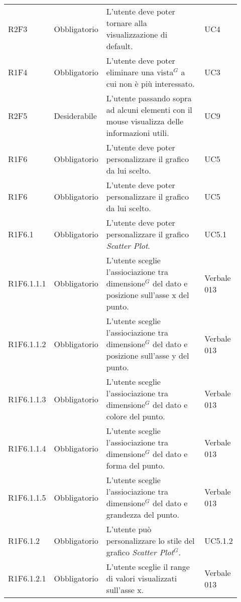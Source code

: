 {\begin{longtable}{p{0.12\linewidth}p{0.15\linewidth}p{0.50\linewidth}p{0.15\linewidth}}
    \rowcolor[RGB]{233, 245, 206}
    R2F3 & Obbligatorio & L'utente deve poter tornare alla visualizzazione di default. & UC4\\

    \rowcolor[RGB]{216, 235, 171}
    R1F4 & Obbligatorio & L'utente deve poter eliminare una vista$^{G}$ a cui non è più interessato. & UC3\\

    \rowcolor[RGB]{233, 245, 206}
    R2F5 & Desiderabile & L'utente passando sopra ad alcuni elementi con il mouse visualizza delle informazioni utili. & UC9\\

    \rowcolor[RGB]{216, 235, 171}
    R1F6 & Obbligatorio & L'utente deve poter personalizzare il grafico da lui scelto. & UC5\\
    \rowcolor[RGB]{233, 245, 206}
    R1F6 & Obbligatorio & L'utente deve poter personalizzare il grafico da lui scelto. & UC5\\
    \rowcolor[RGB]{216, 235, 171}
    R1F6.1 & Obbligatorio & L'utente deve poter personalizzare il grafico \textit{Scatter Plot}. & UC5.1\\
    \rowcolor[RGB]{233, 245, 206}
    R1F6.1.1.1 & Obbligatorio & L'utente sceglie l'assiociazione tra dimensione$^{G}$ del dato e posizione sull'asse x del punto.& Verbale 013\\
    \rowcolor[RGB]{216, 235, 171}
    R1F6.1.1.2 & Obbligatorio & L'utente sceglie l'assiociazione tra dimensione$^{G}$ del dato e posizione sull'asse y del punto.& Verbale 013\\
    \rowcolor[RGB]{233, 245, 206}
    R1F6.1.1.3 & Obbligatorio & L'utente sceglie l'assiociazione tra dimensione$^{G}$ del dato e colore del punto.& Verbale 013\\
    \rowcolor[RGB]{216, 235, 171}
    R1F6.1.1.4 & Obbligatorio & L'utente sceglie l'assiociazione tra dimensione$^{G}$ del dato e forma del punto.& Verbale 013\\
    \rowcolor[RGB]{233, 245, 206}
    R1F6.1.1.5 & Obbligatorio & L'utente sceglie l'assiociazione tra dimensione$^{G}$ del dato e grandezza del punto.& Verbale 013\\
    \rowcolor[RGB]{216, 235, 171}
    R1F6.1.2 & Obbligatorio & L'utente può personalizzare lo stile del grafico \textit{Scatter Plot$^{G}$}. & UC5.1.2\\
    \rowcolor[RGB]{233, 245, 206}
    R1F6.1.2.1 & Obbligatorio & L'utente sceglie il range di valori visualizzati sull'asse x. & Verbale 013 \\

\end{longtable}}
